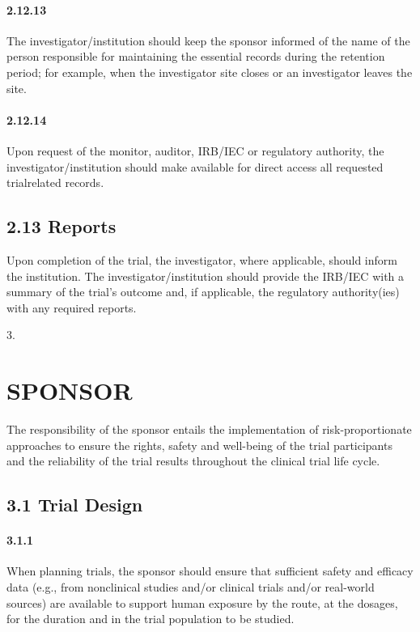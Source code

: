\documentclass[11pt]{article}
\begin{document}
\paragraph{2.12.13} The investigator/institution should keep the sponsor informed of the name of the person responsible for maintaining the essential records during the retention period; for example, when the investigator site closes or an investigator leaves the site.

\paragraph{2.12.14} Upon request of the monitor, auditor, IRB/IEC or regulatory authority, the investigator/institution should make available for direct access all requested trialrelated records.

\subsection{2.13 Reports}

Upon completion of the trial, the investigator, where applicable, should inform the institution. The investigator/institution should provide the IRB/IEC with a summary of the trial's outcome and, if applicable, the regulatory authority(ies) with any required reports.


3.


\section{SPONSOR}

The responsibility of the sponsor entails the implementation of risk-proportionate approaches to ensure the rights, safety and well-being of the trial participants and the reliability of the trial results throughout the clinical trial life cycle.


\subsection{3.1 Trial Design}

\paragraph{3.1.1} When planning trials, the sponsor should ensure that sufficient safety and efficacy data (e.g., from nonclinical studies and/or clinical trials and/or real-world sources) are available to support human exposure by the route, at the dosages, for the duration and in the trial population to be studied.
\end{document}
